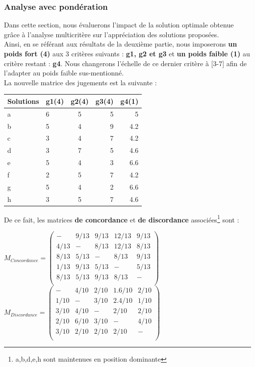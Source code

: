 \documentclass[a4paper, 11pt]{article}
\begin{document}
\subsubsection{Analyse avec pondération}
Dans cette section, nous évaluerons l'impact de la solution optimale obtenue grâce à l'analyse multicritère sur l'appréciation des solutions proposées.\\
Ainsi, en se référant aux résultats de la deuxième partie, nous imposerons \textbf{un poids fort (4)} aux 3 critères suivants : \textbf{g1, g2 et g3} et \textbf{un poids faible (1)} au critère restant : \textbf{g4}. Nous changerons l'échelle de ce dernier critère à [3-7] afin de l'adapter au poids faible sus-mentionné.\\
La nouvelle matrice des jugements est la suivante :\\
\begin{table}[H]
\centering
\begin{tabular}{|l|l|c|r|r|}
  \hline
  Solutions & g1(4) & g2(4) & g3(4) & g4(1)\\
  \hline
  a &6 & 5 & 5 & 5 \\
  b &5 & 4 & 9 & 4.2 \\
  c &3 & 4 & 7 & 4.2 \\
  d &3 & 7 & 5 & 4.6 \\
  e &5 & 4 & 3 & 6.6\\
  f &2 & 5 & 7 & 4.2 \\
  g &5 & 4 & 2 & 6.6\\
  h &3 & 5 & 7 & 4.6\\
  \hline
\end{tabular}
\end{table}
De ce fait, les matrices \textbf{de concordance} et \textbf{de discordance} associées\footnote{a,b,d,e,h sont maintenues en position dominante} sont :
\begin{center}
$ M_{Concordance} =\begin{pmatrix}
-&9/13&9/13&12/13&9/13\\
4/13&-&8/13&12/13&8/13\\
8/13&5/13&-&8/13&9/13\\
1/13&9/13&5/13&-&5/13\\
8/13&5/13&9/13&8/13&-\\
\end{pmatrix} $\\
$ M_{Discordance} =\begin{pmatrix}
-&4/10&2/10&1.6/10&2/10\\
1/10&-&3/10&2.4/10&1/10\\
3/10&4/10&-&2/10&2/10\\
2/10&6/10&3/10&-&4/10\\
3/10&2/10&2/10&2/10&-\\
\end{pmatrix} $\\
\end{center}
\end{document}
